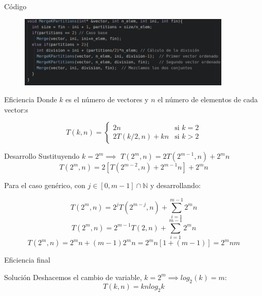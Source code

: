 \begin{frame}
	\begin{block}{Código} %
		\begin{figure}[h]
    		\centering
    		\includegraphics[width=0.9\textwidth]{./Imagenes/dyv.png}
    		\label{fig:mesh1}
		\end{figure}
	\end{block}
\end{frame}


\begin{frame}
	\begin{block}{Eficiencia}
	Donde $k$ es el n\'umero de vectores y $n$ el n\'umero de elementos de cada vector:s

	\[T(k,n) = \left \{ 
	\begin{matrix} 
		2n & 				\mbox{si } k=2
	\\ 2T(k/2,n) + kn & 		\mbox{si } k>2
	\end{matrix}
	\right.\]
	\end{block}
\end{frame}

\begin{frame}
	\begin{block}{Desarrollo}
	Sustituyendo $k=2^m \implies$ $T(2^m, n) = 2T(2^{m-1}, n) + 2^mn$
	\[T(2^m, n) = 2\left[ T(2^{m-2}, n) + 2^{m-1}n \right] + 2^mn\]
	\begin{center}
	Para el caso gen\'erico, con $j \in \left[0,m-1\right] \cap\mathbb{N}$ y 						desarrollando:
	\end{center}
	\[T(2^m, n)	= 2^jT(2^{m-j}, n) + \sum_{i=1}^{m-1} 2^mn\]
	\[T(2^m, n) = 2^{m-1} T(2, n) + \sum_{i=1}^{m-1} 2^mn\]
	\[T(2^m, n) = 2^mn + (m-1) 2^mn = 2^mn[1+(m-1)] = 2^mnm\]
	\end{block}
\end{frame}

\begin{frame}{Eficiencia final}
	\begin{block}{Solución}
	Deshacemos el cambio de variable, $k=2^m \implies log_2(k)=m$:
	\[T(k,n) = knlog_2k\]
	\end{block}
\end{frame}

